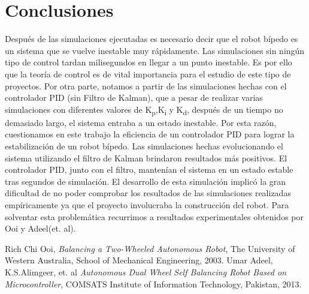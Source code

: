 \documentclass[10pt]{article}
\begin{document}
\section{Conclusiones}
Después de las simulaciones ejecutadas es necesario decir que el robot bípedo es un sistema que se vuelve inestable muy rápidamente. Las simulaciones sin ningún tipo de control tardan milisegundos en llegar a un punto inestable. Es por ello que la teoría de control es de vital importancia para el estudio de este tipo de proyectos. 
Por otra parte, notamos a partir de las simulaciones hechas con el controlador PID (sin Filtro de Kalman), que a pesar de realizar varias simulaciones con diferentes valores de K\textsubscript{p},K\textsubscript{i} y K\textsubscript{d}, después de un tiempo no demasiado largo, el sistema entraba a un estado inestable. Por esta razón, cuestionamos en este trabajo la eficiencia de un controlador PID para lograr la estabilización de un robot bípedo. 
Las simulaciones hechas evolucionando el sistema utilizando el filtro de Kalman brindaron resultados más positivos. El controlador PID, junto con el filtro, mantenían el sistema en un estado estable tras segundos de simulación.
El desarrollo de esta simulación implicó la gran dificultad de no poder comprobar los resultados de las simulaciones realizadas empíricamente ya que el proyecto involucraba la construcción del robot. Para solventar esta problemática recurrimos a resultados experimentales obtenidos por Ooi\cite{ooi03} y Adeel(et. al)\cite{adeel13}.
\begin{thebibliography}{9}

  Rich Chi Ooi,
  \emph{Balancing a Two-Wheeled Autonomous Robot},
  The University of Western Australia, School of Mechanical Engineering,
  2003.
  Umar Adeel, K.S.Alimgeer, et. al
  \emph{Autonomous Dual Wheel Self Balancing Robot Based on Microcontroller},
  COMSATS Institute of Information Technology, Pakistan,
  2013.
\end{thebibliography}
\end{document}
